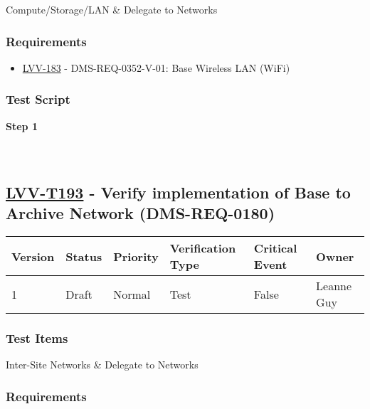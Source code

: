 Compute/Storage/LAN \& Delegate to Networks

\hypertarget{requirements-92}{%
\subsubsection{Requirements}\label{requirements-92}}

\begin{itemize}
\tightlist
\item
  \href{https://jira.lsstcorp.org/browse/LVV-183}{LVV-183} -
  DMS-REQ-0352-V-01: Base Wireless LAN (WiFi)
\end{itemize}

\hypertarget{test-script-92}{%
\subsubsection{Test Script}\label{test-script-92}}

\textbf{Step 1}\\
~\\
~\\

\hypertarget{lvv-t193---verify-implementation-of-base-to-archive-network-dms-req-0180}{%
\subsection{\texorpdfstring{\href{https://jira.lsstcorp.org/secure/Tests.jspa\#/testCase/LVV-T193}{LVV-T193}
- Verify implementation of Base to Archive Network
(DMS-REQ-0180)}{LVV-T193 - Verify implementation of Base to Archive Network (DMS-REQ-0180)}}\label{lvv-t193---verify-implementation-of-base-to-archive-network-dms-req-0180}}

\begin{longtable}[]{@{}llllll@{}}
\toprule
Version & Status & Priority & Verification Type & Critical Event &
Owner\tabularnewline
\midrule
\endhead
1 & Draft & Normal & Test & False & Leanne Guy\tabularnewline
\bottomrule
\end{longtable}

\hypertarget{test-items-93}{%
\subsubsection{Test Items}\label{test-items-93}}

Inter-Site Networks \& Delegate to Networks

\hypertarget{requirements-93}{%
\subsubsection{Requirements}\label{requirements-93}}


